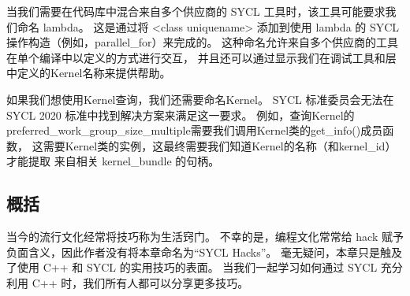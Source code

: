 当我们需要在代码库中混合来自多个供应商的 SYCL 工具时，该工具可能要求我们命名 lambda。 
这是通过将 <class uniquename> 添加到使用 lambda 的 SYCL 操作构造（例如，parallel\_for）来完成的。 
这种命名允许来自多个供应商的工具在单个编译中以定义的方式进行交互，
并且还可以通过显示我们在调试工具和层中定义的Kernel名称来提供帮助。

如果我们想使用Kernel查询，我们还需要命名Kernel。 
SYCL 标准委员会无法在 SYCL 2020 标准中找到解决方案来满足这一要求。 
例如，查询Kernel的preferred\_work\_group\_size\_multiple需要我们调用Kernel类的get\_info()成员函数，
这需要Kernel类的实例，这最终需要我们知道Kernel的名称（和kernel\_id）才能提取 来自相关 kernel\_bundle 的句柄。

\subsection{概括}
当今的流行文化经常将技巧称为生活窍门。 
不幸的是，编程文化常常给 hack 赋予负面含义，因此作者没有将本章命名为“SYCL Hacks”。 
毫无疑问，本章只是触及了使用 C++ 和 SYCL 的实用技巧的表面。 
当我们一起学习如何通过 SYCL 充分利用 C++ 时，我们所有人都可以分享更多技巧。
